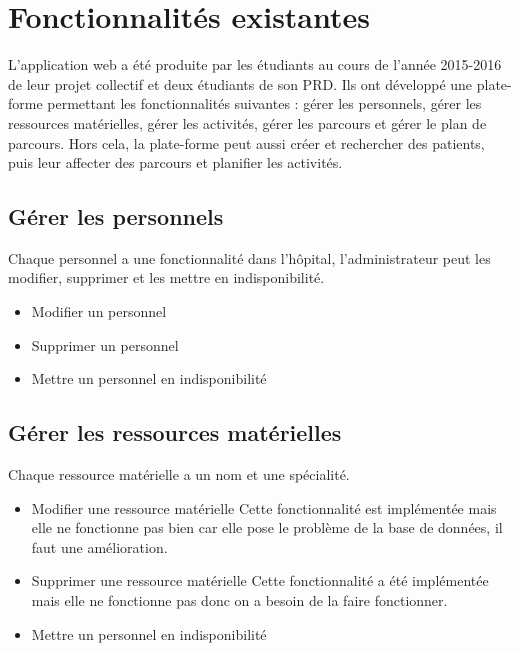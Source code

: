 \documentclass{polytech/polytech}
\begin{document}
\appendix

\chapter{Fonctionnalités existantes}
\label{ann:foncExist}

L'application web a été produite par les étudiants au cours de l'année 2015-2016 de leur projet collectif et deux étudiants de son PRD. Ils ont développé une plate-forme permettant les fonctionnalités suivantes : gérer les personnels, gérer les ressources matérielles, gérer les activités, gérer les parcours et gérer le plan de parcours. Hors cela, la plate-forme peut aussi créer et rechercher des patients, puis leur affecter des parcours et planifier les activités.


\section{Gérer les personnels}

Chaque personnel a une fonctionnalité dans l'hôpital, l'administrateur peut les modifier, supprimer et les mettre en indisponibilité.

\begin{itemize}
	\item Modifier un personnel
	\item Supprimer un personnel
	\item Mettre un personnel en indisponibilité
\end{itemize}

\section{Gérer les ressources matérielles}

Chaque ressource matérielle a un nom et une spécialité.

\begin{itemize}
	\item Modifier une ressource matérielle Cette fonctionnalité est implémentée mais elle ne fonctionne pas bien car elle pose le problème de la base de données, il faut une amélioration.
	\item Supprimer une ressource matérielle Cette fonctionnalité a été implémentée mais elle ne fonctionne pas donc on a besoin de la faire fonctionner.
	\item Mettre un personnel en indisponibilité
\end{itemize}
\end{document}
